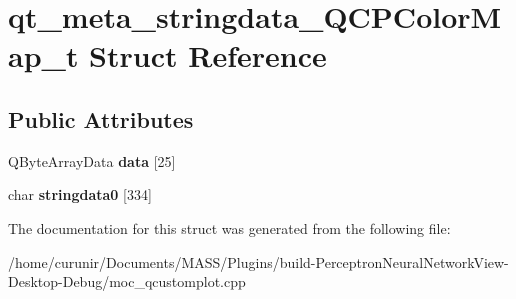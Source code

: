 \hypertarget{structqt__meta__stringdata___q_c_p_color_map__t}{}\section{qt\+\_\+meta\+\_\+stringdata\+\_\+\+Q\+C\+P\+Color\+Map\+\_\+t Struct Reference}
\label{structqt__meta__stringdata___q_c_p_color_map__t}
\subsection*{Public Attributes}
\begin{DoxyCompactItemize}
\item 
Q\+Byte\+Array\+Data {\bfseries data} \mbox{[}25\mbox{]}\hypertarget{structqt__meta__stringdata___q_c_p_color_map__t_accab0e8d36920ac71eecd79ccaa7badf}{}\label{structqt__meta__stringdata___q_c_p_color_map__t_accab0e8d36920ac71eecd79ccaa7badf}

\item 
char {\bfseries stringdata0} \mbox{[}334\mbox{]}\hypertarget{structqt__meta__stringdata___q_c_p_color_map__t_a2edec26054af0f1b2cc81406b21fca92}{}\label{structqt__meta__stringdata___q_c_p_color_map__t_a2edec26054af0f1b2cc81406b21fca92}

\end{DoxyCompactItemize}


The documentation for this struct was generated from the following file\+:\begin{DoxyCompactItemize}
\item 
/home/curunir/\+Documents/\+M\+A\+S\+S/\+Plugins/build-\/\+Perceptron\+Neural\+Network\+View-\/\+Desktop-\/\+Debug/moc\+\_\+qcustomplot.\+cpp\end{DoxyCompactItemize}
